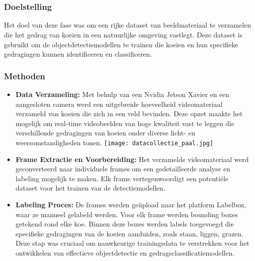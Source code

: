 \chapter{}%
\label{ch:datacollectie}

\subsection{Doelstelling}
Het doel van deze fase was om een rijke dataset van beeldmateriaal te verzamelen die het gedrag van koeien in een natuurlijke omgeving vastlegt. Deze dataset is gebruikt om de objectdetectiemodellen te trainen die koeien en hun specifieke gedragingen kunnen identificeren en classificeren.


\subsection{Methoden}
\begin{itemize}
  \item \textbf{Data Verzameling:}  Met behulp van een Nvidia Jetson Xavier en een aangesloten camera werd een uitgebreide hoeveelheid videomateriaal verzameld van koeien die zich in een veld bevinden. Deze opzet maakte het mogelijk om real-time videobeelden van hoge kwaliteit vast te leggen die verschillende gedragingen van koeien onder diverse licht- en weersomstandigheden tonen.
  \texttt{[image: datacollectie\_paal.jpg]}
  \item \textbf{Frame Extractie en Voorbereiding:} Het verzamelde videomateriaal werd geconverteerd naar individuele frames om een gedetailleerde analyse en labeling mogelijk te maken. Elk frame vertegenwoordigt een potentiële dataset voor het trainen van de detectiemodellen.
  \item \textbf{Labeling Proces:} De frames werden geüpload naar het platform Labelbox, waar ze manueel gelabeld werden. Voor elk frame werden bounding boxes getekend rond elke koe. Binnen deze boxes werden labels toegevoegd die specifieke gedragingen van de koeien aanduiden, zoals staan, liggen, grazen. Deze stap was cruciaal om nauwkeurige trainingsdata te verstrekken voor het ontwikkelen van effectieve objectdetectie en gedragsclassificatiemodellen.
\end{itemize}

